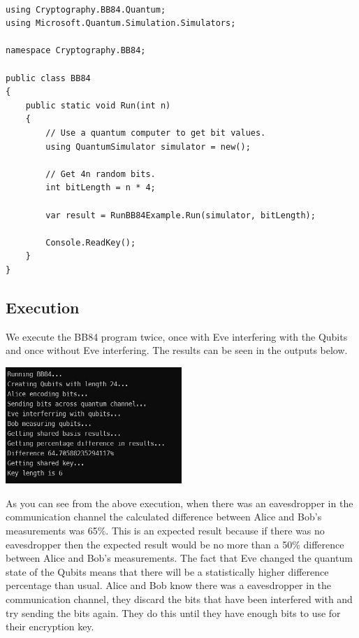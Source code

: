\documentclass{article}
\begin{document}
\begin{lstlisting}[language={[Sharp]C}, caption={C\# Driver code sets the number of qubits to 4n}, label={Script}]

using Cryptography.BB84.Quantum;
using Microsoft.Quantum.Simulation.Simulators;

namespace Cryptography.BB84;

public class BB84
{
    public static void Run(int n)
    {
        // Use a quantum computer to get bit values.
        using QuantumSimulator simulator = new();

        // Get 4n random bits.
        int bitLength = n * 4;

        var result = RunBB84Example.Run(simulator, bitLength);

        Console.ReadKey();
    }
}

\end{lstlisting}

\subsection{Execution}

We execute the BB84 program twice, once with Eve interfering with the Qubits and once without Eve interfering. The results can be seen in the outputs below.

\vspace{5mm}

\includegraphics[width=0.5\textwidth]{BB84Output.jpg}

\vspace{5mm}

As you can see from the above execution, when there was an eavesdropper in the communication channel the calculated difference between Alice and Bob's measurements was 65\%. This is an expected result because if there was no eavesdropper then the expected result would be no more than a 50\% difference between Alice and Bob's measurements. The fact that Eve changed the quantum state of the Qubits means that there will be a statistically higher difference percentage than usual. Alice and Bob know there was a eavesdropper in the communication channel, they discard the bits that have been interfered with and try sending the bits again. They do this until they have enough bits to use for their encryption key.
\end{document}
